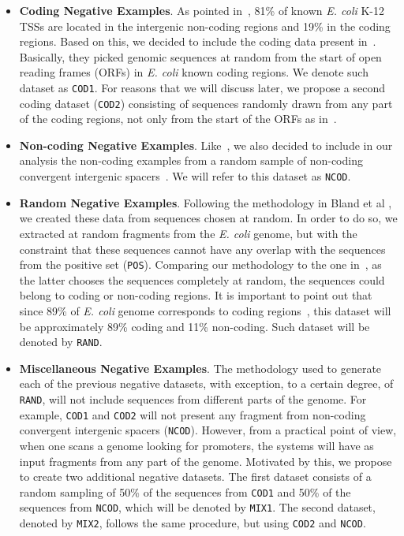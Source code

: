 \documentclass[conference,letterpaper]{IEEEtran}
\begin{document}
\begin{itemize}

\item {\bf Coding Negative Examples}. As pointed in~\cite{gordon2003}, 81\% of known {\it E. coli} K-12 TSSs are located in the intergenic non-coding regions and 19\% in the coding regions. Based on this, we decided to include the coding data present in~\cite{gordon2003,song2011a}. Basically, they picked genomic sequences at random from the start of open reading frames (ORFs) in {\it E. coli} known coding regions. We denote such dataset as {\tt COD1}. For reasons that we will discuss later, we propose a second coding dataset ({\tt COD2}) consisting of sequences randomly drawn from any part of the coding regions, not only from the start of the ORFs as in~\cite{gordon2003,song2011a}. 

\item {\bf Non-coding Negative Examples}. Like~\cite{gordon2003,song2011a}, we also decided to include in our analysis the non-coding examples from a random sample of non-coding convergent intergenic spacers~\cite{palleja2009}. We will refer to this dataset as {\tt NCOD}.

\item {\bf Random Negative Examples}. Following the methodology in Bland et al \cite{bland2010}, we created these data from sequences chosen at random. In order to do so, we extracted at random fragments from the {\it E. coli} genome, but with the constraint that these sequences cannot have any overlap with the sequences from the positive set ({\tt POS}). Comparing our methodology  to the one in~\cite{bland2010}, as the latter chooses the sequences completely at random, the sequences could belong to coding or non-coding regions. It is important to point out that since 89\% of {\it E. coli} genome corresponds to coding regions~\cite{alberts2007}, this dataset will be approximately 89\% coding and 11\% non-coding. Such dataset will be denoted by {\tt RAND}.

\item {\bf Miscellaneous Negative Examples}. The methodology used to generate each of the previous negative datasets, with exception, to a certain degree, of {\tt RAND}, will not include sequences from different parts of the genome. For example, {\tt COD1} and {\tt COD2} will not present any fragment from non-coding convergent intergenic spacers ({\tt NCOD}). However, from a practical point of view, when one scans a genome looking for promoters, the systems will have as input fragments from any part of the genome. Motivated by this, we propose to create two additional negative datasets. The first dataset consists of a random sampling of 50\% of the sequences from {\tt COD1} and  50\% of the sequences from {\tt NCOD}, which will be denoted by {\tt MIX1}. The second dataset, denoted by {\tt MIX2}, follows the same procedure, but using {\tt COD2} and {\tt NCOD}.


\end{itemize}
\end{document}
